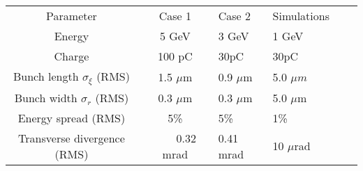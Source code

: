 \documentclass[%
 onecolumn,notitlepage,
 amsmath,amssymb,
 aps,
 longbibliography
]{revtex4-1}
\begin{document}
\begin{center}
\begin{minipage}[t]{0.7\textwidth}
\begin{table}[H]
\begin{ruledtabular}
\begin{tabular}{cclllc}
&\hspace{-12pt}{EuPRAXIA bunch parameters}\vspace{1pt} \\
\hline
Parameter& Case 1 &\hspace{-35pt} Case 2 & Simulations\\
\hline
Energy&5 GeV  &\hspace{-35pt} 3 GeV &1 GeV  \\
Charge&100 pC &\hspace{-35pt} 30pC& 30pC \\
Bunch length $\sigma_{\xi}$ (RMS)&1.5 $\mu$m  &\hspace{-35pt}  0.9 $\mu$m &5.0 $\mu m$ \\
Bunch width $\sigma_{r}$ (RMS)&0.3 $\mu$m & \hspace{-35pt} 0.3 $\mu$m&5.0 $\mu$m   \\
Energy spread (RMS)&\hspace{-10pt} 5\%\hspace{10pt}  &\hspace{-35pt} 5\%  &1\% \\
Transverse divergence (RMS) &~~~~0.32 mrad  &  \hspace{-35pt} 0.41 mrad &10 $\mu$rad \\
\end{tabular}
\end{ruledtabular}
\end{table}
\end{minipage}
\end{center}
\end{document}
